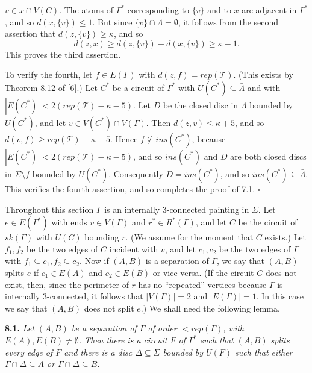 \noindent $v \in \bar{x} \cap V(C)$. The atoms of $\Gamma^*$ corresponding to $\{v\}$ and to $x$ are adjacent in $\Gamma^*$, and so $d(x, \{v\}) \le 1$. But since $\{v\} \cap \Lambda = \emptyset$, it follows from the second assertion that $d(z, \{v\}) \ge \kappa$, and so
\begin{equation*}
d(z, x) \ge d(z, \{v\}) - d(x, \{v\}) \ge \kappa - 1.
\end{equation*}
This proves the third assertion.

To verify the fourth, let $f \in E(\Gamma)$ with $d(z, f) = rep(\mathscr{T})$. (This exists by Theorem 8.12 of [6].) Let $C^*$ be a circuit of $\Gamma^*$ with $U(C^*) \subseteq \bar{\Lambda}$ and with $|E(C^*)| < 2(rep(\mathscr{T}) - \kappa - 5)$. Let $D$ be the closed disc in $\bar{\Lambda}$ bounded by $U(C^*)$, and let $v \in V(C^*) \cap V(\Gamma)$. Then $d(z, v) \le \kappa + 5$, and so $d(v, f) \ge rep(\mathscr{T}) - \kappa - 5$. Hence $f \nsubseteq ins(C^*)$, because $|E(C^*)| < 2(rep(\mathscr{T}) - \kappa - 5)$, and so $ins(C^*)$ and $D$ are both closed discs in $\Sigma \setminus f$ bounded by $U(C^*)$. Consequently $D = ins(C^*)$, and so $ins(C^*) \subseteq \bar{\Lambda}$. This verifies the fourth assertion, and so completes the proof of 7.1. $\square$


Throughout this section $\Gamma$ is an internally 3-connected painting in $\Sigma$. Let $e \in E(\Gamma^*)$ with ends $v \in V(\Gamma)$ and $r^* \in R^*(\Gamma)$, and let $C$ be the circuit of $sk(\Gamma)$ with $U(C)$ bounding $r$. (We assume for the moment that $C$ exists.) Let $f_1, f_2$ be the two edges of $C$ incident with $v$, and let $c_1, c_2$ be the two edges of $\Gamma$ with $f_1 \subseteq c_1, f_2 \subseteq c_2$. Now if $(A, B)$ is a separation of $\Gamma$, we say that $(A, B)$ splits $e$ if $c_1 \in E(A)$ and $c_2 \in E(B)$ or vice versa. (If the circuit $C$ does not exist, then, since the perimeter of $r$ has no ``repeated'' vertices because $\Gamma$ is internally 3-connected, it follows that $|V(\Gamma)| = 2$ and $|E(\Gamma)| = 1$. In this case we say that $(A, B)$ does not split $e$.) We shall need the following lemma.

\textbf{8.1.} \textit{Let $(A, B)$ be a separation of $\Gamma$ of order $< rep(\Gamma)$, with $E(A), E(B) \ne \emptyset$. Then there is a circuit $F$ of $\Gamma^*$ such that $(A, B)$ splits every edge of $F$ and there is a disc $\Delta \subseteq \hat{\Sigma}$ bounded by $U(F)$ such that either $\Gamma \cap \Delta \subseteq A$ or $\Gamma \cap \Delta \subseteq B$.}

